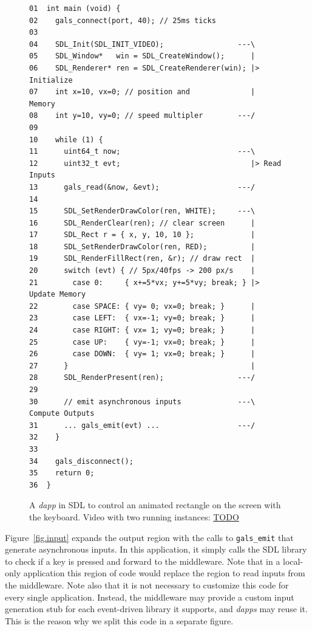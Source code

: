 \documentclass[sigplan,screen]{acmart}
\begin{document}
\begin{figure}[t]
{\scriptsize
\begin{verbatim}
01  int main (void) {
02    gals_connect(port, 40); // 25ms ticks
03
04    SDL_Init(SDL_INIT_VIDEO);                 ---\
05    SDL_Window*   win = SDL_CreateWindow();      |
06    SDL_Renderer* ren = SDL_CreateRenderer(win); |> Initialize
07    int x=10, vx=0; // position and              |    Memory
08    int y=10, vy=0; // speed multipler        ---/
09
10    while (1) {
11      uint64_t now;                           ---\
12      uint32_t evt;                              |> Read Inputs
13      gals_read(&now, &evt);                  ---/
14
15      SDL_SetRenderDrawColor(ren, WHITE);     ---\
16      SDL_RenderClear(ren); // clear screen      |
17      SDL_Rect r = { x, y, 10, 10 };             |
18      SDL_SetRenderDrawColor(ren, RED);          |
19      SDL_RenderFillRect(ren, &r); // draw rect  |
20      switch (evt) { // 5px/40fps -> 200 px/s    |
21        case 0:     { x+=5*vx; y+=5*vy; break; } |> Update Memory
22        case SPACE: { vy= 0; vx=0; break; }      |
23        case LEFT:  { vx=-1; vy=0; break; }      |
24        case RIGHT: { vx= 1; vy=0; break; }      |
25        case UP:    { vy=-1; vx=0; break; }      |
26        case DOWN:  { vy= 1; vx=0; break; }      |
27      }                                          |
28      SDL_RenderPresent(ren);                 ---/
29
30      // emit asynchronous inputs             ---\  Compute Outputs
31      ... gals_emit(evt) ...                  ---/
32    }
33
34    gals_disconnect();
35    return 0;
36  }
\end{verbatim}
}
  \caption{
    \label{fig.sdl}
    A \emph{dapp} in SDL to control an animated rectangle on the screen with
    the keyboard. Video with two running instances: \url{TODO}
  }
\end{figure}

Figure~\ref{fig.input} expands the output region with the calls to
\texttt{gals\_emit} that generate asynchronous inputs.
In this application, it simply calls the SDL library to check if a key is
pressed and forward to the middleware.
Note that in a local-only application this region of code would replace the
region to read inputs from the middleware.
Note also that it is not necessary to customize this code for every single
application.
Instead, the middleware may provide a custom input generation stub for each
event-driven library it supports, and \emph{dapps} may reuse it.
This is the reason why we split this code in a separate figure.
\end{document}
